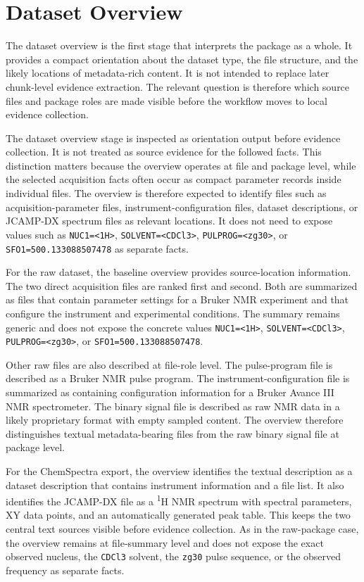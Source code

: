 \section{Dataset Overview}
\label{sec:results-dataset-overview}

The dataset overview is the first stage that interprets the package as a whole.
It provides a compact orientation about the dataset type, the file structure, and the likely locations of metadata-rich content.
It is not intended to replace later chunk-level evidence extraction.
The relevant question is therefore which source files and package roles are made visible before the workflow moves to local evidence collection.

The dataset overview stage is inspected as orientation output before evidence collection.
It is not treated as source evidence for the followed facts.
This distinction matters because the overview operates at file and package level, while the selected acquisition facts often occur as compact parameter records inside individual files.
The overview is therefore expected to identify files such as acquisition-parameter files, instrument-configuration files, dataset descriptions, or \ac{JCAMP-DX} spectrum files as relevant locations.
It does not need to expose values such as \texttt{NUC1=<1H>}, \texttt{SOLVENT=<CDCl3>}, \texttt{PULPROG=<zg30>}, or \texttt{SFO1=500.133088507478} as separate facts.

For the raw dataset, the baseline overview provides source-location information.
The two direct acquisition files are ranked first and second.
Both are summarized as files that contain parameter settings for a Bruker \ac{NMR} experiment and that configure the instrument and experimental conditions.
The summary remains generic and does not expose the concrete values \texttt{NUC1=<1H>}, \texttt{SOLVENT=<CDCl3>}, \texttt{PULPROG=<zg30>}, or \texttt{SFO1=500.133088507478}.

Other raw files are also described at file-role level.
The pulse-program file is described as a Bruker \ac{NMR} pulse program.
The instrument-configuration file is summarized as containing configuration information for a Bruker Avance III \ac{NMR} spectrometer.
The binary signal file is described as raw \ac{NMR} data in a likely proprietary format with empty sampled content.
The overview therefore distinguishes textual metadata-bearing files from the raw binary signal file at package level.

For the ChemSpectra export, the overview identifies the textual description as a dataset description that contains instrument information and a file list.
It also identifies the \ac{JCAMP-DX} file as a \textsuperscript{1}H \ac{NMR} spectrum with spectral parameters, XY data points, and an automatically generated peak table.
This keeps the two central text sources visible before evidence collection.
As in the raw-package case, the overview remains at file-summary level and does not expose the exact observed nucleus, the \texttt{CDCl3} solvent, the \texttt{zg30} pulse sequence, or the observed frequency as separate facts.


